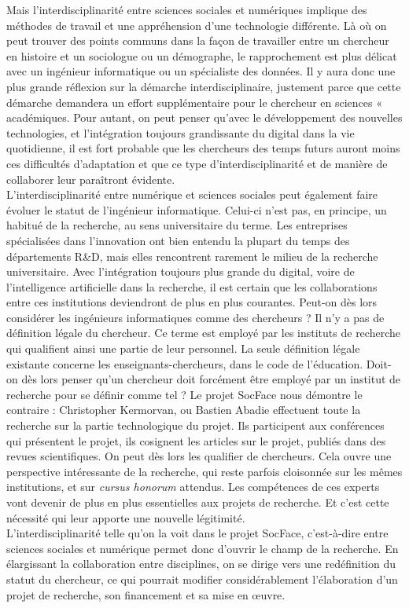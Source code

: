 Mais l’interdisciplinarité entre sciences sociales et numériques implique des méthodes de travail et une appréhension d’une technologie différente. Là où on peut trouver des points communs dans la façon de travailler entre un chercheur en histoire et un sociologue ou un démographe, le rapprochement est plus délicat avec un ingénieur informatique ou un spécialiste des données. Il y aura donc une plus grande réflexion sur la démarche interdisciplinaire, justement parce que cette démarche demandera un effort supplémentaire pour le chercheur en sciences « académiques. Pour autant, on peut penser qu’avec le développement des nouvelles technologies, et l’intégration toujours grandissante du digital dans la vie quotidienne, il est fort probable que les chercheurs des temps futurs auront moins ces difficultés d’adaptation et que ce type d’interdisciplinarité et de manière de collaborer leur paraîtront évidente. \\
L’interdisciplinarité entre numérique et sciences sociales peut également faire évoluer le statut de l’ingénieur informatique. Celui-ci n’est pas, en principe, un habitué de la recherche, au sens universitaire du terme. Les entreprises spécialisées dans l’innovation ont bien entendu la plupart du temps des départements R\&D, mais elles rencontrent rarement le milieu de la recherche universitaire. Avec l’intégration toujours plus grande du digital, voire de l’intelligence artificielle dans la recherche, il est certain que les collaborations entre ces institutions deviendront de plus en plus courantes. Peut-on dès lors considérer les ingénieurs informatiques comme des chercheurs ? Il n’y a pas de définition légale du chercheur. Ce terme est employé par les instituts de recherche qui qualifient ainsi une partie de leur personnel. La seule définition légale existante concerne les enseignants-chercheurs, dans le code de l’éducation. Doit-on dès lors penser qu’un chercheur doit forcément être employé par un institut de recherche pour se définir comme tel ? Le projet SocFace nous démontre le contraire : Christopher Kermorvan, ou Bastien Abadie effectuent toute la recherche sur la partie technologique du projet. Ils participent aux conférences qui présentent le projet, ils cosignent les articles sur le projet, publiés dans des revues scientifiques. On peut dès lors les qualifier de chercheurs. Cela ouvre une perspective intéressante de la recherche, qui reste parfois cloisonnée sur les mêmes institutions, et sur \textit{cursus honorum} attendus. Les compétences de ces experts vont devenir de plus en plus essentielles aux projets de recherche. Et c’est cette nécessité qui leur apporte une nouvelle légitimité. \\
L’interdisciplinarité telle qu’on la voit dans le projet SocFace, c’est-à-dire entre sciences sociales et numérique permet donc d’ouvrir le champ de la recherche. En élargissant la collaboration entre disciplines, on se dirige vers une redéfinition du statut du chercheur, ce qui pourrait modifier considérablement l’élaboration d’un projet de recherche, son financement et sa mise en œuvre. 
